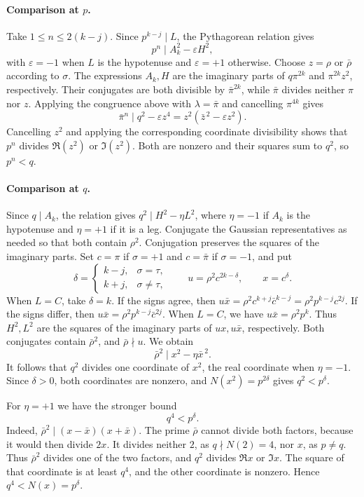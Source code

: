 \documentclass[11pt,a4paper,twoside]{article}
\numberwithin{equation}{section}
\begin{document}
\paragraph{Comparison at \(p\).}
Take \(1\le n\le 2(k-j)\). Since \(p^{k-j}\mid L\), the Pythagorean relation gives
\[
p^n\mid A_k^2-\varepsilon H^2,
\]
with \(\varepsilon=-1\) when \(L\) is the hypotenuse and \(\varepsilon=+1\) otherwise. Choose \(z=\rho\) or \(\bar\rho\) according to \(\sigma\). The expressions \(A_k,H\) are the imaginary parts of \(q\pi^{2k}\) and \(\pi^{2k}z^2\), respectively. Their conjugates are both divisible by \(\bar\pi^{2k}\), while \(\bar\pi\) divides neither \(\pi\) nor \(z\). Applying the congruence above with \(\lambda=\bar\pi\) and cancelling \(\pi^{4k}\) gives
\[
\bar\pi^n\mid q^2-\varepsilon z^4=z^2(\bar z^{\,2}-\varepsilon z^2).
\]
Cancelling \(z^2\) and applying the corresponding coordinate divisibility shows that \(p^n\) divides \(\Re(z^2)\) or \(\Im(z^2)\). Both are nonzero and their squares sum to \(q^2\), so \(p^n<q\).

\paragraph{Comparison at \(q\).}
Since \(q\mid A_k\), the relation gives \(q^2\mid H^2-\eta L^2\), where \(\eta=-1\) if \(A_k\) is the hypotenuse and \(\eta=+1\) if it is a leg. Conjugate the Gaussian representatives as needed so that both contain \(\rho^2\). Conjugation preserves the squares of the imaginary parts. Set \(c=\pi\) if \(\sigma=+1\) and \(c=\bar\pi\) if \(\sigma=-1\), and put
\[
\delta=
\begin{cases}
k-j,&\sigma=\tau,\\
k+j,&\sigma\ne\tau,
\end{cases}
\qquad
u=\rho^2c^{2k-\delta},
\qquad x=c^\delta .
\]
When \(L=C\), take \(\delta=k\). If the signs agree, then \(u\bar x=\rho^2c^{k+j}\bar c^{k-j}=\rho^2p^{k-j}c^{2j}\). If the signs differ, then \(u\bar x=\rho^2p^{k-j}\bar c^{2j}\). When \(L=C\), we have \(u\bar x=\rho^2p^k\). Thus \(H^2,L^2\) are the squares of the imaginary parts of \(ux,u\bar x\), respectively. Both conjugates contain \(\bar\rho^2\), and \(\bar\rho\nmid u\). We obtain
\[
\bar\rho^2\mid x^2-\eta\bar x^{\,2}.
\]
It follows that \(q^2\) divides one coordinate of \(x^2\), the real coordinate when \(\eta=-1\). Since \(\delta>0\), both coordinates are nonzero, and \(N(x^2)=p^{2\delta}\) gives \(q^2<p^\delta\).

For \(\eta=+1\) we have the stronger bound
\[
q^4<p^\delta.
\]
Indeed, \(\bar\rho^2\mid(x-\bar x)(x+\bar x)\). The prime \(\bar\rho\) cannot divide both factors, because it would then divide \(2x\). It divides neither \(2\), as \(q\nmid N(2)=4\), nor \(x\), as \(p\ne q\). Thus \(\bar\rho^2\) divides one of the two factors, and \(q^2\) divides \(\Re x\) or \(\Im x\). The square of that coordinate is at least \(q^4\), and the other coordinate is nonzero. Hence \(q^4<N(x)=p^\delta\).
\end{document}
